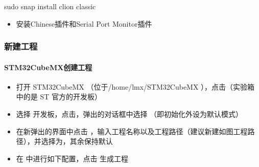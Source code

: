 \documentclass[a4paper,12pt,english]{sphinxmanual}
\begin{document}
\begin{sphinxVerbatim}[commandchars=\\\{\}]
sudo snap install clion \PYGZhy{}\PYGZhy{}classic
\end{sphinxVerbatim}
\begin{itemize}
\item {} 
\sphinxAtStartPar
安装Chinese插件和Serial Port Monitor插件

\end{itemize}




\subsubsection{新建工程}
\label{\detokenize{exp-stm32/ide-setup:id7}}

\paragraph{STM32CubeMX创建工程}
\label{\detokenize{exp-stm32/ide-setup:id8}}\begin{itemize}
\item {} 
\sphinxAtStartPar
打开 STM32CubeMX （位于/home/lmx/STM32CubeMX ），点击（实验箱中的是 ST 官方的开发板）

\item {} 
\sphinxAtStartPar
选择  开发板，点击，弹出的对话框中选择 （即初始化外设为默认模式）

\end{itemize}

\sphinxAtStartPar
{}
\begin{itemize}
\item {} 
\sphinxAtStartPar
在新弹出的界面中点击 ，输入工程名称以及工程路径（建议新建如图工程路径），并选择为，其余保持默认

\end{itemize}

\sphinxAtStartPar
{}
\begin{itemize}
\item {} 
\sphinxAtStartPar
在  中进行如下配置，点击  生成工程

\end{itemize}
\end{document}
